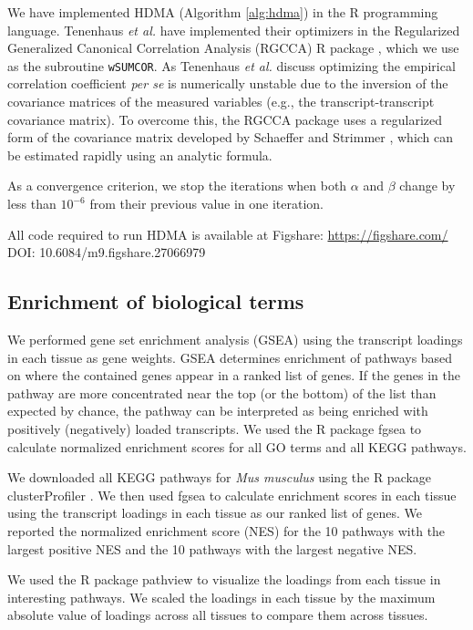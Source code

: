 \documentclass[
]{article}
\begin{document}
We have implemented HDMA (Algorithm \ref{alg:hdma}) in the R programming
language. Tenenhaus \textit{et al.} have implemented their optimizers in
the Regularized Generalized Canonical Correlation Analysis (RGCCA) R
package \cite{girka2023multiblock}, which we use as the subroutine
\texttt{wSUMCOR}. As Tenenhaus \textit{et al.} discuss optimizing the
empirical correlation coefficient \textit{per se} is numerically
unstable due to the inversion of the covariance matrices of the measured
variables (e.g., the transcript-transcript covariance matrix). To
overcome this, the RGCCA package uses a regularized form of the
covariance matrix developed by Schaeffer and Strimmer
\cite{schafer2005shrinkage}, which can be estimated rapidly using an
analytic formula.

As a convergence criterion, we stop the iterations when both \(\alpha\)
and \(\beta\) change by less than \(10^{-6}\) from their previous value
in one iteration.

All code required to run HDMA is available at Figshare:
\url{https://figshare.com/} DOI: 10.6084/m9.figshare.27066979

\subsection{Enrichment of biological
terms}\label{enrichment-of-biological-terms}

We performed gene set enrichment analysis (GSEA) \cite{pmid16199517}
using the transcript loadings in each tissue as gene weights. GSEA
determines enrichment of pathways based on where the contained genes
appear in a ranked list of genes. If the genes in the pathway are more
concentrated near the top (or the bottom) of the list than expected by
chance, the pathway can be interpreted as being enriched with positively
(negatively) loaded transcripts. We used the R package fgsea
\cite{fgsea} to calculate normalized enrichment scores for all GO terms
and all KEGG pathways.

We downloaded all KEGG \cite{pmid36300620} pathways for
\textit{Mus musculus} using the R package clusterProfiler
\cite{pmid36300620}. We then used fgsea to calculate enrichment scores
in each tissue using the transcript loadings in each tissue as our
ranked list of genes. We reported the normalized enrichment score (NES)
for the 10 pathways with the largest positive NES and the 10 pathways
with the largest negative NES.

We used the R package pathview \cite{pmid23740750} to visualize the
loadings from each tissue in interesting pathways. We scaled the
loadings in each tissue by the maximum absolute value of loadings across
all tissues to compare them across tissues.
\end{document}
